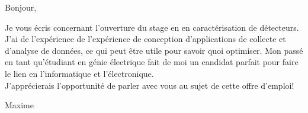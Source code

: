 \documentclass[12pt,french]{letter}
\begin{document}

\begin{letter}{}
\address{Montréal, Canada}

\opening{Bonjour,}


Je vous écris concernant l'ouverture du stage en  en caractérisation de détecteurs.
\\J'ai de l'expérience de l'expérience de conception d'applications de collecte et d'analyse de données, ce qui peut être utile pour savoir quoi optimiser. Mon passé en tant qu'étudiant en génie électrique fait de moi un candidat parfait pour faire le lien en l'informatique et l'électronique.
\\J'apprécierais l'opportunité de parler avec vous au sujet de cette offre d'emploi!

\closing{Maxime}


\end{letter}
\end{document}
